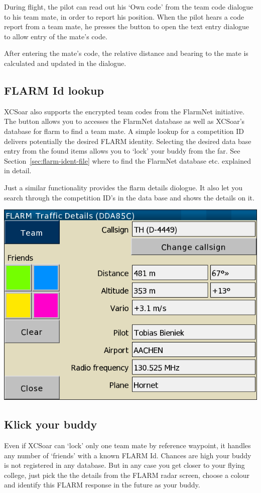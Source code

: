 During flight, the pilot can read out his `Own code' from the team
code dialogue to his team mate, in order to report his position.  When
the pilot hears a code report from a team mate, he presses the 
button to open the text entry dialogue to allow entry of the mate's code.

After entering the mate's code, the relative distance and
bearing to the mate is calculated and updated in the dialogue.

\subsection*{FLARM Id lookup}
XCSoar also supports the encrypted team codes from the FlarmNet initiative.
The  button allows you to accesses the FlarmNet database as well
as XCSoar's database for flarm to find a team mate. A simple
lookup for a competition ID delivers potentially the desired
FLARM identity. Selecting the desired data base entry from the found items allows you
to `lock' your buddy from the far. See Section~\ref{sec:flarm-ident-file}
where to find the FlarmNet database etc. explained in detail.

Just a similar functionality provides the flarm details diologue. It also let
you search through the competition ID's in the data base and shows the details on it.

\begin{center}
\includegraphics[angle=0,width=0.8\linewidth,keepaspectratio='true']{figures/dialog-flarmdetails.png}
\end{center}

\subsection*{Klick your buddy}
Even if XCSoar can `lock' only one team mate by reference waypoint,
it handles any number of `friends' with a known FLARM Id. Chances are high your buddy is not
registered in any database. But in any case you get closer to
your flying college, just pick the the details from the FLARM radar screen, choose
a colour and identify this FLARM response in the future as your buddy.


